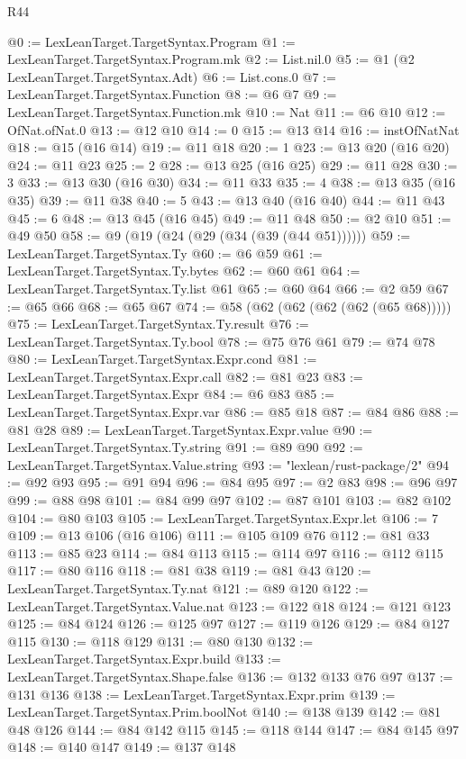 \begin{lexlean}{R44}
\begin{coremodule}
@0 := LexLeanTarget.TargetSyntax.Program
@1 := LexLeanTarget.TargetSyntax.Program.mk
@2 := List.nil.{0}
@5 := @1 (@2 LexLeanTarget.TargetSyntax.Adt)
@6 := List.cons.{0}
@7 := LexLeanTarget.TargetSyntax.Function
@8 := @6 @7
@9 := LexLeanTarget.TargetSyntax.Function.mk
@10 := Nat
@11 := @6 @10
@12 := OfNat.ofNat.{0}
@13 := @12 @10
@14 := 0
@15 := @13 @14
@16 := instOfNatNat
@18 := @15 (@16 @14)
@19 := @11 @18
@20 := 1
@23 := @13 @20 (@16 @20)
@24 := @11 @23
@25 := 2
@28 := @13 @25 (@16 @25)
@29 := @11 @28
@30 := 3
@33 := @13 @30 (@16 @30)
@34 := @11 @33
@35 := 4
@38 := @13 @35 (@16 @35)
@39 := @11 @38
@40 := 5
@43 := @13 @40 (@16 @40)
@44 := @11 @43
@45 := 6
@48 := @13 @45 (@16 @45)
@49 := @11 @48
@50 := @2 @10
@51 := @49 @50
@58 := @9 (@19 (@24 (@29 (@34 (@39 (@44 @51))))))
@59 := LexLeanTarget.TargetSyntax.Ty
@60 := @6 @59
@61 := LexLeanTarget.TargetSyntax.Ty.bytes
@62 := @60 @61
@64 := LexLeanTarget.TargetSyntax.Ty.list @61
@65 := @60 @64
@66 := @2 @59
@67 := @65 @66
@68 := @65 @67
@74 := @58 (@62 (@62 (@62 (@62 (@65 @68)))))
@75 := LexLeanTarget.TargetSyntax.Ty.result
@76 := LexLeanTarget.TargetSyntax.Ty.bool
@78 := @75 @76 @61
@79 := @74 @78
@80 := LexLeanTarget.TargetSyntax.Expr.cond
@81 := LexLeanTarget.TargetSyntax.Expr.call
@82 := @81 @23
@83 := LexLeanTarget.TargetSyntax.Expr
@84 := @6 @83
@85 := LexLeanTarget.TargetSyntax.Expr.var
@86 := @85 @18
@87 := @84 @86
@88 := @81 @28
@89 := LexLeanTarget.TargetSyntax.Expr.value
@90 := LexLeanTarget.TargetSyntax.Ty.string
@91 := @89 @90
@92 := LexLeanTarget.TargetSyntax.Value.string
@93 := "lexlean/rust-package/2"
@94 := @92 @93
@95 := @91 @94
@96 := @84 @95
@97 := @2 @83
@98 := @96 @97
@99 := @88 @98
@101 := @84 @99 @97
@102 := @87 @101
@103 := @82 @102
@104 := @80 @103
@105 := LexLeanTarget.TargetSyntax.Expr.let
@106 := 7
@109 := @13 @106 (@16 @106)
@111 := @105 @109 @76
@112 := @81 @33
@113 := @85 @23
@114 := @84 @113
@115 := @114 @97
@116 := @112 @115
@117 := @80 @116
@118 := @81 @38
@119 := @81 @43
@120 := LexLeanTarget.TargetSyntax.Ty.nat
@121 := @89 @120
@122 := LexLeanTarget.TargetSyntax.Value.nat
@123 := @122 @18
@124 := @121 @123
@125 := @84 @124
@126 := @125 @97
@127 := @119 @126
@129 := @84 @127 @115
@130 := @118 @129
@131 := @80 @130
@132 := LexLeanTarget.TargetSyntax.Expr.build
@133 := LexLeanTarget.TargetSyntax.Shape.false
@136 := @132 @133 @76 @97
@137 := @131 @136
@138 := LexLeanTarget.TargetSyntax.Expr.prim
@139 := LexLeanTarget.TargetSyntax.Prim.boolNot
@140 := @138 @139
@142 := @81 @48 @126
@144 := @84 @142 @115
@145 := @118 @144
@147 := @84 @145 @97
@148 := @140 @147
@149 := @137 @148

\end{coremodule}
\end{lexlean}
